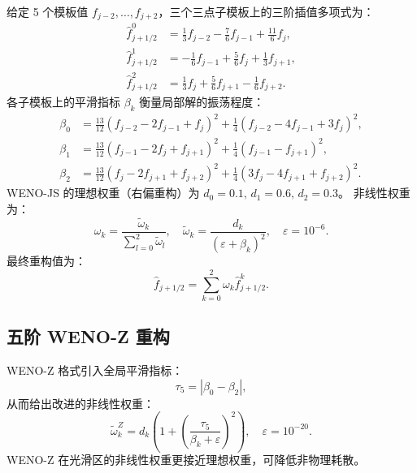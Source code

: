 \documentclass{article}
\numberwithin{equation}{section}
\begin{document}
给定 5 个模板值 $f_{j-2},\ldots,f_{j+2}$，三个三点子模板上的三阶插值多项式为：
\begin{subequations}
\begin{align}
    \hat{f}^0_{j+1/2} &= \frac{1}{3}f_{j-2} - \frac{7}{6}f_{j-1} + \frac{11}{6}f_j, \\
    \hat{f}^1_{j+1/2} &= -\frac{1}{6}f_{j-1} + \frac{5}{6}f_j + \frac{1}{3}f_{j+1}, \\
    \hat{f}^2_{j+1/2} &= \frac{1}{3}f_j + \frac{5}{6}f_{j+1} - \frac{1}{6}f_{j+2}.
\end{align}
\end{subequations}
各子模板上的平滑指标 $\beta_k$ 衡量局部解的振荡程度：
\begin{subequations}
\begin{align}
    \beta_0 &= \frac{13}{12}(f_{j-2} - 2f_{j-1} + f_j)^2 + \frac{1}{4}(f_{j-2} - 4f_{j-1} + 3f_j)^2, \\
    \beta_1 &= \frac{13}{12}(f_{j-1} - 2f_j + f_{j+1})^2 + \frac{1}{4}(f_{j-1} - f_{j+1})^2, \\
    \beta_2 &= \frac{13}{12}(f_j - 2f_{j+1} + f_{j+2})^2 + \frac{1}{4}(3f_j - 4f_{j+1} + f_{j+2})^2.
\end{align}
\end{subequations}
WENO-JS 的理想权重（右偏重构）为 $d_0 = 0.1,\, d_1 = 0.6,\, d_2 = 0.3$。
非线性权重为：
\begin{equation}
    \omega_k = \frac{\tilde{\omega}_k}{\sum_{l=0}^2 \tilde{\omega}_l},\quad
    \tilde{\omega}_k = \frac{d_k}{(\varepsilon + \beta_k)^2},\quad \varepsilon = 10^{-6}.
\end{equation}
最终重构值为：
\begin{equation}
    \hat{f}_{j+1/2} = \sum_{k=0}^2 \omega_k \hat{f}^k_{j+1/2}.
\end{equation}

\subsection{五阶 WENO-Z 重构}

WENO-Z 格式\cite{borges2008}引入全局平滑指标：
\begin{equation}
    \tau_5 = |\beta_0 - \beta_2|,
\end{equation}
从而给出改进的非线性权重：
\begin{equation}
    \tilde{\omega}_k^Z = d_k\left(1 + \left(\frac{\tau_5}{\beta_k + \varepsilon}\right)^2\right),\quad \varepsilon = 10^{-20}.
\end{equation}
WENO-Z 在光滑区的非线性权重更接近理想权重，可降低非物理耗散。
\end{document}
